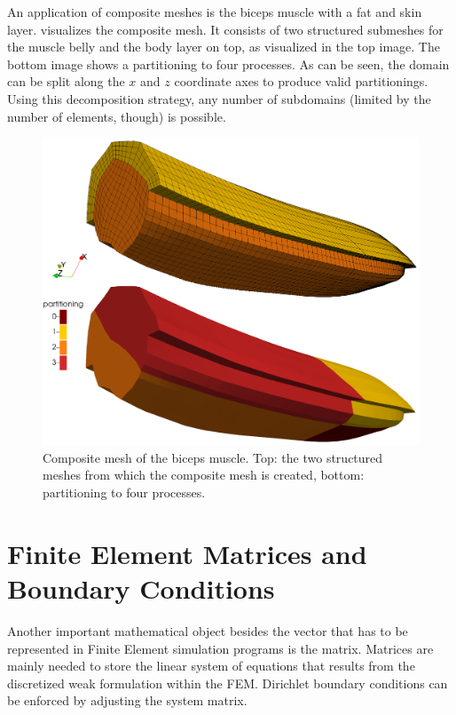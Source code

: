 An application of composite meshes is the biceps muscle with a fat and skin layer.  visualizes the composite mesh. It consists of two structured submeshes for the muscle belly and the body layer on top, as visualized in the top image. The bottom image shows a partitioning to four processes. As can be seen, the domain can be split along the $x$ and $z$ coordinate axes to produce valid partitionings. Using this decomposition strategy, any number of subdomains (limited by the number of elements, though) is possible.

\begin{figure}%
  \centering%
  \includegraphics[width=\textwidth]{images/implementation/composite_muscle_mesh0.png}%
  \caption{Composite mesh of the biceps muscle. Top: the two structured meshes from which the composite mesh is created, bottom: partitioning to four processes.}%
  \label{fig:composite_muscle_mesh0}%
\end{figure}%

\section{Finite Element Matrices and Boundary Conditions}\label{sec:fem_matrices_and_bc}
Another important mathematical object besides the vector that has to be represented in Finite Element simulation programs is the matrix. Matrices are mainly needed to store the linear system of equations that results from the discretized weak formulation within the FEM. Dirichlet boundary conditions can be enforced by adjusting the system matrix.

